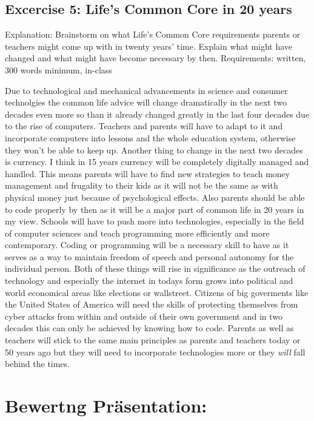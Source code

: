\documentclass{article}
\begin{document}
\subsection{Excercise 5: Life's Common Core in 20 years}
Explanation: Brainstorm on what Life's Common Core requirements parents or teachers might come up with in twenty years' time. Explain what might have changed and what might have become necessary by then.
Requirements: written, 300 words minimum, in-class

Due to technological and mechanical advancements in science and consumer technolgies the common life advice will change dramatically in the next two decades even more so than it already changed greatly in the last four decades due to the rise of computers. Teachers and parents will have to adapt to it and incorporate computers into lessons and the whole education system, otherwise they won't be able to keep up. Another thing to change in the next two decades is currency. I think in 15 years currency will be completely digitally managed and handled. This means parents will have to find new strategies to teach money management and frugality to their kids as it will not be the same as with physical money just because of psychological effects. Also parents should be able to code properly by then as it will be a major part of common life in 20 years in my view. Schools will have to push more into technologies, especially in the field of computer sciences and teach programming more efficiently and more contemporary. Coding or programming will be a necessary skill to have as it serves as a way to maintain freedom of speech and personal autonomy for the individual person. Both of these things will rise in significance as the outreach of technology and especially the internet in todays form grows into political and world economical areas like elections or wallstreet. Citizens of big goverments like the United States of America will need the skills of protecting themselves from cyber attacks from within and outside of their own government and in two decades this can only be achieved by knowing how to code. Parents as well as teachers will stick to the same main principles as parents and teachers today or 50 years ago but they will need to incorporate technologies more or they \textit{will} fall behind the times.

\section{Bewertng Präsentation:}
\end{document}
